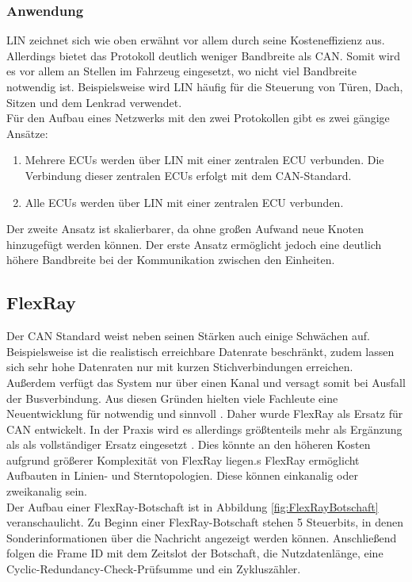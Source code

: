 \subsubsection{Anwendung}
\ac{LIN} zeichnet sich wie oben erwähnt vor allem durch seine Kosteneffizienz aus. Allerdings bietet das Protokoll deutlich weniger Bandbreite als \acs{CAN}. Somit wird es vor allem an Stellen im Fahrzeug eingesetzt, wo nicht viel Bandbreite notwendig ist. Beispielsweise wird \acs{LIN} häufig für die Steuerung von Türen, Dach, Sitzen und dem Lenkrad verwendet. \cite[59]{Fijalkowski.2011} \\
Für den Aufbau eines Netzwerks mit den zwei Protokollen gibt es zwei gängige Ansätze:
\begin{enumerate}
\item Mehrere \acsp{ECU} werden über \acs{LIN} mit einer zentralen \acs{ECU} verbunden. Die Verbindung dieser zentralen \acsp{ECU} erfolgt mit dem \acs{CAN}-Standard.
\item Alle \acsp{ECU} werden über \acs{LIN} mit einer zentralen \acs{ECU} verbunden.
\end{enumerate}
Der zweite Ansatz ist skalierbarer, da ohne großen Aufwand neue Knoten hinzugefügt werden können. Der erste Ansatz ermöglicht jedoch eine deutlich höhere Bandbreite bei der Kommunikation zwischen den Einheiten. \cite[58]{Fijalkowski.2011}


\subsection{FlexRay}
Der \ac{CAN} Standard weist neben seinen Stärken auch einige Schwächen auf. Beispielsweise ist die realistisch erreichbare Datenrate beschränkt, zudem lassen sich sehr hohe Datenraten nur mit kurzen Stichverbindungen erreichen. Außerdem verfügt das System nur über einen Kanal und versagt somit bei Ausfall der Busverbindung. Aus diesen Gründen hielten viele Fachleute eine Neuentwicklung für notwendig und sinnvoll \cite[96]{Zimmermann.2014}. Daher wurde FlexRay als Ersatz für \acs{CAN} entwickelt. In der Praxis wird es allerdings größtenteils mehr als Ergänzung als als vollständiger Ersatz eingesetzt \cite[97]{Zimmermann.2014}. Dies könnte an den höheren Kosten aufgrund größerer Komplexität von FlexRay liegen.s FlexRay ermöglicht Aufbauten in Linien- und Sterntopologien. Diese können einkanalig oder zweikanalig sein.\\
Der Aufbau einer FlexRay-Botschaft ist in Abbildung \ref{fig:FlexRayBotschaft} veranschaulicht. Zu Beginn einer FlexRay-Botschaft stehen 5 Steuerbits, in denen Sonderinformationen über die Nachricht angezeigt werden können. Anschließend folgen die Frame ID mit dem Zeitslot der Botschaft, die Nutzdatenlänge, eine Cyclic-Redundancy-Check-Prüfsumme und ein Zykluszähler. 


